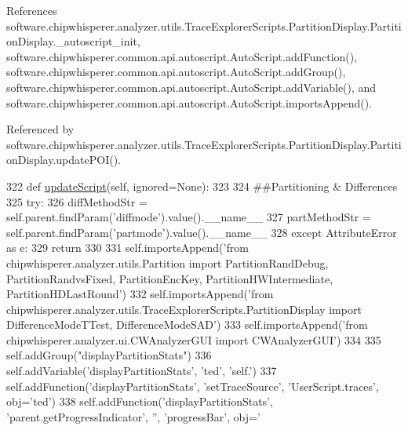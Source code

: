 References software.\+chipwhisperer.\+analyzer.\+utils.\+Trace\+Explorer\+Scripts.\+Partition\+Display.\+Partition\+Display.\+\_\+autoscript\+\_\+init, software.\+chipwhisperer.\+common.\+api.\+autoscript.\+Auto\+Script.\+add\+Function(), software.\+chipwhisperer.\+common.\+api.\+autoscript.\+Auto\+Script.\+add\+Group(), software.\+chipwhisperer.\+common.\+api.\+autoscript.\+Auto\+Script.\+add\+Variable(), and software.\+chipwhisperer.\+common.\+api.\+autoscript.\+Auto\+Script.\+imports\+Append().



Referenced by software.\+chipwhisperer.\+analyzer.\+utils.\+Trace\+Explorer\+Scripts.\+Partition\+Display.\+Partition\+Display.\+update\+P\+O\+I().


\begin{DoxyCode}
322     \textcolor{keyword}{def }\hyperlink{classsoftware_1_1chipwhisperer_1_1analyzer_1_1utils_1_1TraceExplorerScripts_1_1PartitionDisplay_1_1PartitionDisplay_a904da578c4f1798a75a6990aaadece5f}{updateScript}(self, ignored=None):
323 
324         \textcolor{comment}{##Partitioning & Differences}
325         \textcolor{keywordflow}{try}:
326             diffMethodStr = self.parent.findParam(\textcolor{stringliteral}{'diffmode'}).value().\_\_name\_\_
327             partMethodStr = self.parent.findParam(\textcolor{stringliteral}{'partmode'}).value().\_\_name\_\_
328         \textcolor{keywordflow}{except} AttributeError \textcolor{keyword}{as} e:
329             \textcolor{keywordflow}{return}
330 
331         self.importsAppend(\textcolor{stringliteral}{'from chipwhisperer.analyzer.utils.Partition import PartitionRandDebug,
       PartitionRandvsFixed, PartitionEncKey, PartitionHWIntermediate, PartitionHDLastRound'})
332         self.importsAppend(\textcolor{stringliteral}{'from chipwhisperer.analyzer.utils.TraceExplorerScripts.PartitionDisplay import
       DifferenceModeTTest, DifferenceModeSAD'})
333         self.importsAppend(\textcolor{stringliteral}{'from chipwhisperer.analyzer.ui.CWAnalyzerGUI import CWAnalyzerGUI'})
334 
335         self.addGroup(\textcolor{stringliteral}{"displayPartitionStats"})
336         self.addVariable(\textcolor{stringliteral}{'displayPartitionStats'}, \textcolor{stringliteral}{'ted'}, \textcolor{stringliteral}{'self.'})
337         self.addFunction(\textcolor{stringliteral}{'displayPartitionStats'}, \textcolor{stringliteral}{'setTraceSource'}, \textcolor{stringliteral}{'UserScript.traces'}, obj=\textcolor{stringliteral}{'ted'})
338         self.addFunction(\textcolor{stringliteral}{'displayPartitionStats'}, \textcolor{stringliteral}{'parent.getProgressIndicator'}, \textcolor{stringliteral}{''}, \textcolor{stringliteral}{'progressBar'}, obj=\textcolor{stringliteral}{'
}
\end{DoxyCode}
